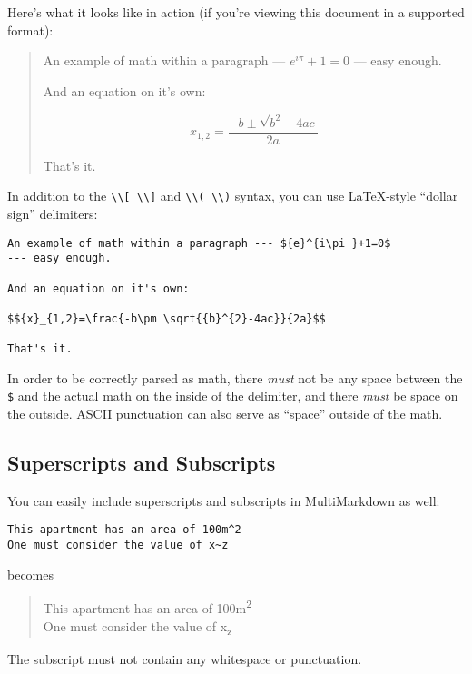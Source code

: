 Here's what it looks like in action (if you're viewing this document in a
supported format):

\begin{quote}
An example of math within a paragraph --- \({e}^{i\pi }+1=0\)
--- easy enough.

And an equation on it's own:

\[ {x}_{1,2}=\frac{-b\pm \sqrt{{b}^{2}-4ac}}{2a} \]

That's it.
\end{quote}

In addition to the \texttt{\textbackslash{}\textbackslash{}[ \textbackslash{}\textbackslash{}]} and \texttt{\textbackslash{}\textbackslash{}( \textbackslash{}\textbackslash{})} syntax, you can use LaTeX-style ``dollar sign'' delimiters:

\begin{verbatim}
An example of math within a paragraph --- ${e}^{i\pi }+1=0$
--- easy enough.

And an equation on it's own:

$${x}_{1,2}=\frac{-b\pm \sqrt{{b}^{2}-4ac}}{2a}$$

That's it.
\end{verbatim}

In order to be correctly parsed as math, there \emph{must} not be any space between the \texttt{\$} and the actual math on the inside of the delimiter, and there \emph{must} be space on the outside. ASCII punctuation can also serve as ``space'' outside of the math.

\subsection{Superscripts and Subscripts}
\label{superscriptsandsubscripts}

You can easily include superscripts and subscripts in MultiMarkdown as well:

\begin{verbatim}
This apartment has an area of 100m^2
One must consider the value of x~z
\end{verbatim}

becomes

\begin{quote}
This apartment has an area of 100m\textsuperscript{2}\\
One must consider the value of x\textsubscript{z}
\end{quote}

The subscript must not contain any whitespace or punctuation.

